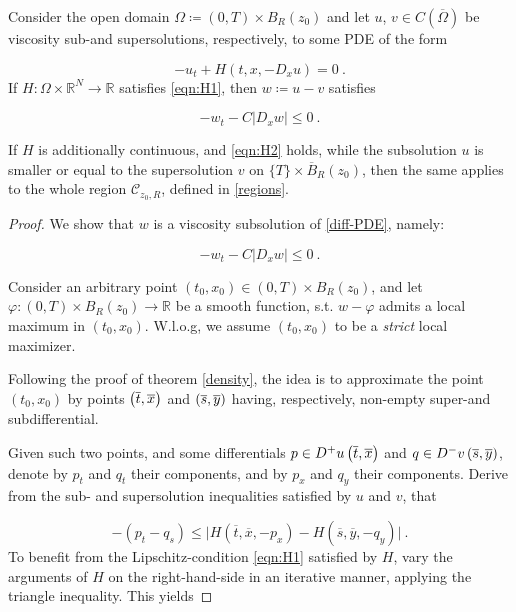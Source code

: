 \begin{theorem}
	\label{viscosity_loc}
	Consider the open domain $ \Omega \coloneqq \left( 0, T \right) \times B_R(z_0) $ and let $ u $, $ v \in C(\overline{\Omega}) $ be viscosity sub-and supersolutions, respectively, to some PDE of the form
	
	\begin{equation*}
	-u_t + H(t, x, -D_x u) = 0 \ .
	\end{equation*}
	If $ H : \Omega \times \mathbb{R}^{N} \to \mathbb{R} $ satisfies \eqref{eqn:H1}, then $ w \coloneqq u - v $ satisfies
	
	\begin{equation*}
	-w_t - C \lvert D_x w \rvert \leq 0 \ .
	\end{equation*}
	
	If $ H $ is additionally continuous, and \eqref{eqn:H2} holds, while the subsolution $ u $ is smaller or equal to the supersolution $ v $ on $ \{ T \} \times \overline{B}_R (z_0) $, then the same applies to the whole region $ \mathcal{C}_{z_0, R} $, defined in \ref{regions}.
		  	\begin{proof}
		  		We show that $ w $ is a viscosity subsolution of \eqref{diff-PDE}, namely:
		  		
		  		\begin{equation*}
		  			-w_t - C \lvert D_x w \rvert \leq 0 \ .
		  		\end{equation*}
		  		
		  		Consider an arbitrary point $ (t_0, x_0) \in \left( 0, T \right) \times B_R(z_0) $, and let $ \varphi : \left( 0, T \right) \times B_R(z_0) \to \mathbb{R} $ be a smooth function, s.t. $ w - \varphi $ admits a local maximum in $ (t_0, x_0) $. W.l.o.g, we assume $ (t_0, x_0) $ to be a \emph{strict} local maximizer.
		  		
		  		Following the proof of theorem \ref{density}, the idea is to approximate the point $ (t_0, x_0) $ by points $ \left(\overline{t}, \overline{x}\right) $ and $ \left(\overline{s}, \overline{y}\right) $ having, respectively, non-empty super-and subdifferential.
		  		
		  		Given such two points, and some differentials $ p \in D^{+} u \left(\overline{t}, \overline{x}\right) $ and $ q \in D^{-} v \left(\overline{s}, \overline{y}\right) $, denote by $ p_t $ and $ q_t $ their  components, and by $ p_x $ and $ q_y $ their  components. Derive from the sub- and supersolution inequalities satisfied by $ u $ and $ v $, that
		  		
		  		\begin{equation*}
		  		-(p_t - q_s) \leq \lvert H(\overline{t}, \overline{x}, -p_x) - H(\overline{s}, \overline{y}, -q_y) \rvert \ .
		  		\end{equation*}
		  		To benefit from the Lipschitz-condition \eqref{eqn:H1} satisfied by $ H $, vary the arguments of $ H $ on the right-hand-side in an iterative manner, applying the triangle inequality. This yields
		  		

\end{proof}
\end{theorem}
